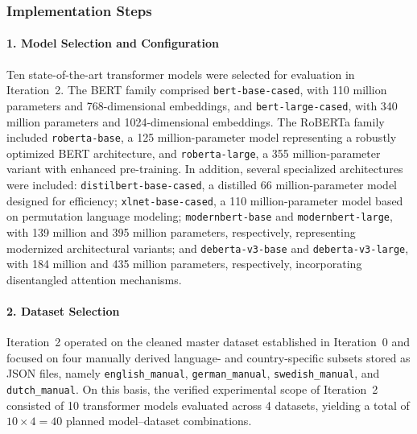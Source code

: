 \documentclass[11pt, titlepage, bibliography=totoc]{scrreprt}
\begin{document}
\subsubsection{Implementation Steps}

\paragraph{1. Model Selection and Configuration}
Ten state-of-the-art transformer models were selected for evaluation in Iteration~2. The BERT family comprised \texttt{bert-base-cased}, with 110 million parameters and 768-dimensional embeddings, and \texttt{bert-large-cased}, with 340 million parameters and 1024-dimensional embeddings. The RoBERTa family included \texttt{roberta-base}, a 125 million-parameter model representing a robustly optimized BERT architecture, and \texttt{roberta-large}, a 355 million-parameter variant with enhanced pre-training. In addition, several specialized architectures were included: \texttt{distilbert-base-cased}, a distilled 66 million-parameter model designed for efficiency; \texttt{xlnet-base-cased}, a 110 million-parameter model based on permutation language modeling; \texttt{modernbert-base} and \texttt{modernbert-large}, with 139 million and 395 million parameters, respectively, representing modernized architectural variants; and \texttt{deberta-v3-base} and \texttt{deberta-v3-large}, with 184 million and 435 million parameters, respectively, incorporating disentangled attention mechanisms.

\paragraph{2. Dataset Selection}
Iteration~2 operated on the cleaned master dataset established in Iteration~0 and focused on four manually derived language- and country-specific subsets stored as JSON files, namely \texttt{english\_manual}, \texttt{german\_manual}, \texttt{swedish\_manual}, and \texttt{dutch\_manual}. On this basis, the verified experimental scope of Iteration~2 consisted of 10 transformer models evaluated across 4 datasets, yielding a total of \(10 \times 4 = 40\) planned model--dataset combinations.
\end{document}

